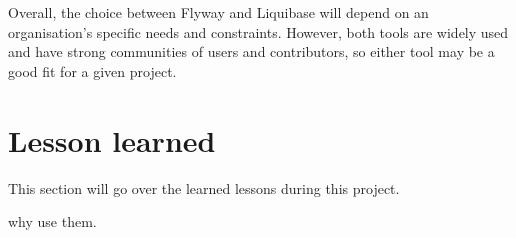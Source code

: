 Overall, the choice between Flyway and Liquibase will depend on an organisation's specific needs and constraints. However, both tools are widely used and have strong communities of users and contributors, so either tool may be a good fit for a given project.

\section{Lesson learned}
This section will go over the learned lessons during this project.


why use them.









